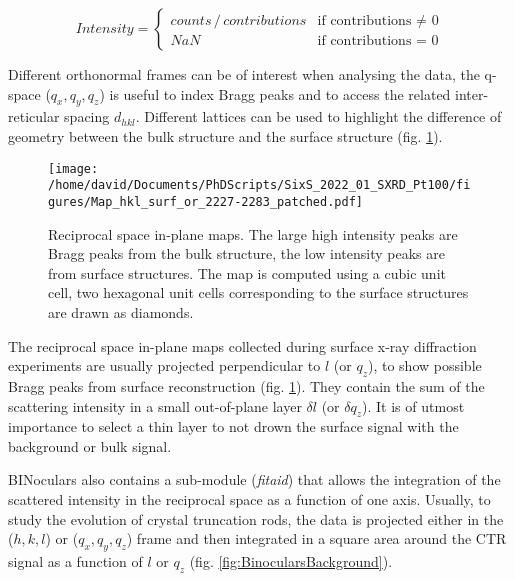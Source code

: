 \begin{equation}
    \label{eq:BinocularsIntensity}
    Intensity =
        \begin{cases}
            counts \, /  \,contributions  & \text{if contributions $\neq$ 0} \\
            NaN & \text{if contributions = 0}
        \end{cases}
\end{equation}

Different orthonormal frames can be of interest when analysing the data, the q-space ($q_x, q_y, q_z$) is useful to index Bragg peaks and to access the related inter-reticular spacing $d_{hkl}$.
Different lattices can be used to highlight the difference of geometry between the bulk structure and the surface structure (fig. \ref{fig:MapExampleBinoculars}).

\begin{figure}[!htb]
    \centering
    \texttt{[image: /home/david/Documents/PhDScripts/SixS\_2022\_01\_SXRD\_Pt100/figures/Map\_hkl\_surf\_or\_2227-2283\_patched.pdf]}
    \caption{
    Reciprocal space in-plane maps.
    The large high intensity peaks are Bragg peaks from the bulk structure, the low intensity peaks are from surface structures.
    The map is computed using a cubic unit cell, two hexagonal unit cells corresponding to the surface structures are drawn as diamonds.
    }
    \label{fig:MapExampleBinoculars}
\end{figure}

The reciprocal space in-plane maps collected during surface x-ray diffraction experiments are usually projected perpendicular to $l$ (or $q_z$), to show possible Bragg peaks from surface reconstruction (fig. \ref{fig:MapExampleBinoculars}).
They contain the sum of the scattering intensity in a small out-of-plane layer $\delta l$ (or $\delta q_z$).
It is of utmost importance to select a thin layer to not drown the surface signal with the background or bulk signal.

BINoculars also contains a sub-module (\textit{fitaid}) that allows the integration of the scattered intensity in the reciprocal space as a function of one axis.
Usually, to study the evolution of crystal truncation rods, the data is projected either in the ($h, k, l$) or ($q_x, q_y, q_z$) frame and then integrated in a square area around the CTR signal as a function of $l$ or $q_z$ (fig. \ref{fig:BinocularsBackground}).

